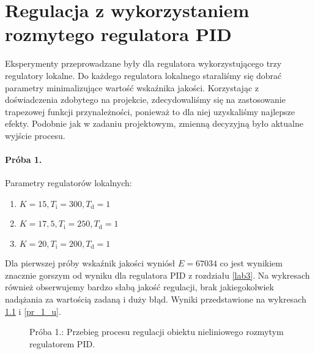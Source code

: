 \chapter{Regulacja z wykorzystaniem rozmytego regulatora PID}
\label{lab4}

Eksperymenty przeprowadzane były dla regulatora wykorzystującego trzy regulatory lokalne. 
Do każdego regulatora lokalnego staraliśmy się dobrać parametry minimalizujące wartość wskaźnika jakości.
Korzystając z doświadczenia zdobytego na projekcie, zdecydowaliśmy się na zastosowanie trapezowej funkcji przynależności,
ponieważ to dla niej uzyskaliśmy najlepsze efekty. Podobnie jak w zadaniu projektowym, zmienną decyzyjną
było aktualne wyjście procesu.

\subsubsection{Próba 1.}
Parametry regulatorów lokalnych:
\begin{enumerate}
\item $K = 15, T_{\mathrm{i}} = 300,  T_{\mathrm{d}} = 1$
\item $K = 17,5, T_{\mathrm{i}} = 250,  T_{\mathrm{d}} = 1$
\item $K = 20, T_{\mathrm{i}} = 200,  T_{\mathrm{d}} = 1$
\end{enumerate}

Dla pierwszej próby wskaźnik jakości wyniósł $E = \num{67034}$ co jest wynikiem znacznie gorszym od wyniku dla regulatora PID z rozdziału \ref{lab3}. Na wykresach również obserwujemy bardzo słabą jakość regulacji, brak jakiegokolwiek nadążania za wartością zadaną i duży błąd. Wyniki przedstawione na wykresach \ref{pr_1_y} i \ref{pr_1_u}.

\begin{figure}[t]
    \centering
    \caption{Próba 1.: Przebieg procesu regulacji obiektu nieliniowego rozmytym regulatorem PID.}
    \label{pr_1_y}
\end{figure}

